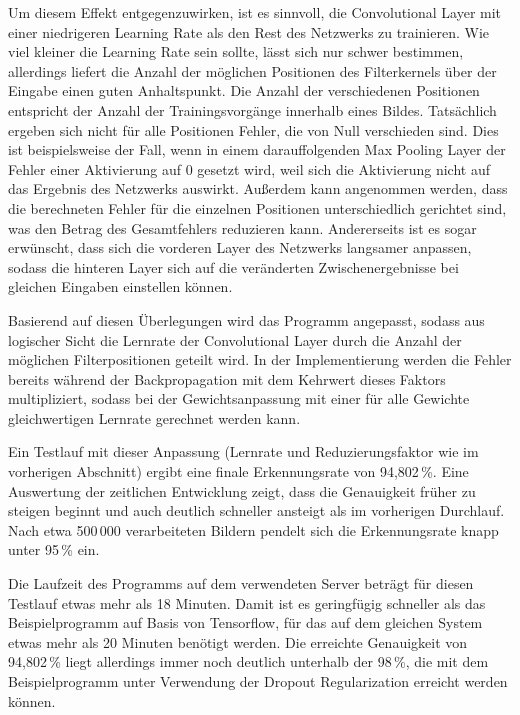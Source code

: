 \documentclass[../main.tex]{subfiles}
\begin{document}
Um diesem Effekt entgegenzuwirken, ist es sinnvoll, die Convolutional Layer mit einer niedrigeren Learning Rate als den Rest des Netzwerks zu trainieren. Wie viel kleiner die Learning Rate sein sollte, lässt sich nur schwer bestimmen, allerdings liefert die Anzahl der möglichen Positionen des Filterkernels über der Eingabe einen guten Anhaltspunkt. Die Anzahl der verschiedenen Positionen entspricht der Anzahl der Trainingsvorgänge innerhalb eines Bildes. Tatsächlich ergeben sich nicht für alle Positionen Fehler, die von Null verschieden sind. Dies ist beispielsweise der Fall, wenn in einem darauffolgenden Max Pooling Layer der Fehler einer Aktivierung auf 0 gesetzt wird, weil sich die Aktivierung nicht auf das Ergebnis des Netzwerks auswirkt. Außerdem kann angenommen werden, dass die berechneten Fehler für die einzelnen Positionen unterschiedlich gerichtet sind, was den Betrag des Gesamtfehlers reduzieren kann. Andererseits ist es sogar erwünscht, dass sich die vorderen Layer des Netzwerks langsamer anpassen, sodass die hinteren Layer sich auf die veränderten Zwischenergebnisse bei gleichen Eingaben einstellen können. 

Basierend auf diesen Überlegungen wird das Programm angepasst, sodass aus logischer Sicht die Lernrate der Convolutional Layer durch die Anzahl der möglichen Filterpositionen geteilt wird. In der Implementierung werden die Fehler bereits während der Backpropagation mit dem Kehrwert dieses Faktors multipliziert, sodass bei der Gewichtsanpassung mit einer für alle Gewichte gleichwertigen Lernrate gerechnet werden kann. 

Ein Testlauf mit dieser Anpassung (Lernrate und Reduzierungsfaktor wie im vorherigen Abschnitt) ergibt eine finale Erkennungsrate von 94,802\,\%. Eine Auswertung der zeitlichen Entwicklung zeigt, dass die Genauigkeit früher zu steigen beginnt und auch deutlich schneller ansteigt als im vorherigen Durchlauf. Nach etwa 500\,000 verarbeiteten Bildern pendelt sich die Erkennungsrate knapp unter 95\,\% ein. 

Die Laufzeit des Programms auf dem verwendeten Server beträgt für diesen Testlauf etwas mehr als 18 Minuten. Damit ist es geringfügig schneller als das Beispielprogramm auf Basis von Tensorflow, für das auf dem gleichen System etwas mehr als 20 Minuten benötigt werden. Die erreichte Genauigkeit von 94,802\,\% liegt allerdings immer noch deutlich unterhalb der 98\,\%, die mit dem Beispielprogramm unter Verwendung der Dropout Regularization erreicht werden können. 
\end{document}
